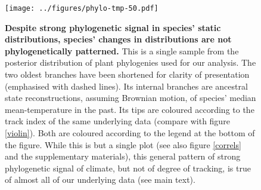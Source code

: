 \documentclass[12pt]{report}
\begin{document}
\clearpage
\begin{landscape}
\begin{figure}[h!]
  \begin{center}
    \texttt{[image: ../figures/phylo-tmp-50.pdf]}
  \end{center}
  \caption{\doublespacing \textbf{Despite strong phylogenetic signal
      in species' static distributions, species' changes in
      distributions are not phylogenetically patterned.} This is a
    single sample from the posterior distribution of plant phylogenies
    used for our analysis\supercite{Smith2018}. The two oldest
    branches have been shortened for clarity of presentation
    (emphasised with dashed lines). Its internal branches are
    ancestral state reconstructions, assuming Brownian motion, of
    species' median mean-temperature in the past. Its tips are
    coloured according to the track index of the same underlying data
    (compare with figure \ref{violin}). Both are coloured according to
    the legend at the bottom of the figure. While this is but a single
    plot (see also figure \ref{correls} and the supplementary
    materials), this general pattern of strong phylogenetic signal of
    climate, but not of degree of tracking, is true of almost all of
    our underlying data (see main text).}
  \label{pca}
\end{figure}
\end{landscape}
\end{document}
